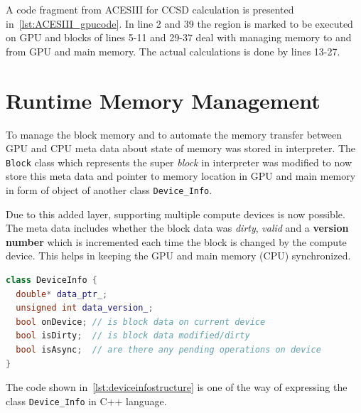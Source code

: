 A code fragment from ACESIII for CCSD calculation is presented
in~\ref{lst:ACESIII_gpucode}. In line 2 and 39 the region is marked to be executed
on GPU and blocks of lines 5-11 and 29-37 deal with managing memory to and from
GPU and main memory. The actual calculations is done by lines 13-27.

\section{Runtime Memory Management}
To manage the block memory and to automate the memory transfer between GPU and CPU
meta data about state of memory was stored in interpreter. The \texttt{Block} class
which represents the super \textit{block} in interpreter was modified to now store
this meta data and pointer to memory location in GPU and main memory in form of
object of another class \texttt{Device\_Info}.

Due to this added layer, supporting multiple compute devices is now possible.
The meta data includes whether the block data was \textit{dirty}, \textit{valid}
and a \textbf{version number} which is incremented each time the block is changed
by the compute device. This helps in keeping the GPU and main memory (CPU)
synchronized.

\begin{lstlisting}[caption={\texttt{Device\_Info} Class structure},
  language=C++,
  label={lst:deviceinfostructure}]
class DeviceInfo {
  double* data_ptr_;
  unsigned int data_version_;
  bool onDevice; // is block data on current device
  bool isDirty;  // is block data modified/dirty
  bool isAsync;  // are there any pending operations on device
}
\end{lstlisting}

The code shown in~\ref{lst:deviceinfostructure} is one of the way of expressing
the class \texttt{Device\_Info} in C++ language.

